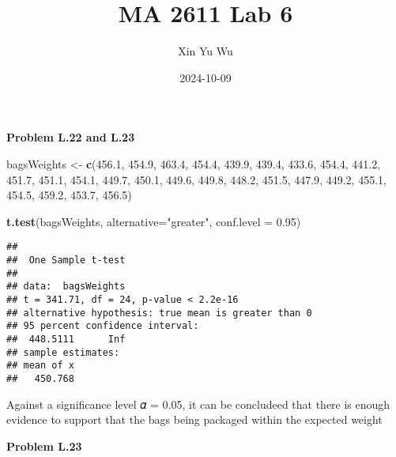 \documentclass[
]{article}
\title{MA 2611 Lab 6}
\author{Xin Yu Wu}
\date{2024-10-09}
\newenvironment{Shaded}{\begin{snugshade}}{\end{snugshade}}
\newcommand{\AttributeTok}[1]{\textcolor[rgb]{0.13,0.29,0.53}{#1}}
\newcommand{\DecValTok}[1]{\textcolor[rgb]{0.00,0.00,0.81}{#1}}
\newcommand{\FloatTok}[1]{\textcolor[rgb]{0.00,0.00,0.81}{#1}}
\newcommand{\FunctionTok}[1]{\textcolor[rgb]{0.13,0.29,0.53}{\textbf{#1}}}
\newcommand{\NormalTok}[1]{#1}
\newcommand{\OtherTok}[1]{\textcolor[rgb]{0.56,0.35,0.01}{#1}}
\newcommand{\SpecialCharTok}[1]{\textcolor[rgb]{0.81,0.36,0.00}{\textbf{#1}}}
\newcommand{\StringTok}[1]{\textcolor[rgb]{0.31,0.60,0.02}{#1}}
\begin{document}
\maketitle

\textbf{Problem L.22 and L.23}

\begin{Shaded}
\begin{Highlighting}[]
\NormalTok{bagsWeights }\OtherTok{\textless{}{-}} \FunctionTok{c}\NormalTok{(}\FloatTok{456.1}\NormalTok{, }\FloatTok{454.9}\NormalTok{, }\FloatTok{463.4}\NormalTok{, }\FloatTok{454.4}\NormalTok{, }\FloatTok{439.9}\NormalTok{, }\FloatTok{439.4}\NormalTok{, }\FloatTok{433.6}\NormalTok{, }\FloatTok{454.4}\NormalTok{, }\FloatTok{441.2}\NormalTok{, }\FloatTok{451.7}\NormalTok{, }\FloatTok{451.1}\NormalTok{, }\FloatTok{454.1}\NormalTok{, }\FloatTok{449.7}\NormalTok{, }\FloatTok{450.1}\NormalTok{, }\FloatTok{449.6}\NormalTok{, }\FloatTok{449.8}\NormalTok{, }\FloatTok{448.2}\NormalTok{, }\FloatTok{451.5}\NormalTok{, }\FloatTok{447.9}\NormalTok{, }\FloatTok{449.2}\NormalTok{, }\FloatTok{455.1}\NormalTok{, }\FloatTok{454.5}\NormalTok{, }\FloatTok{459.2}\NormalTok{, }\FloatTok{453.7}\NormalTok{, }\FloatTok{456.5}\NormalTok{)}

\FunctionTok{t.test}\NormalTok{(bagsWeights, }\AttributeTok{alternative=}\StringTok{"greater"}\NormalTok{, }\AttributeTok{conf.level =} \FloatTok{0.95}\NormalTok{)}
\end{Highlighting}
\end{Shaded}

\begin{verbatim}
## 
##  One Sample t-test
## 
## data:  bagsWeights
## t = 341.71, df = 24, p-value < 2.2e-16
## alternative hypothesis: true mean is greater than 0
## 95 percent confidence interval:
##  448.5111      Inf
## sample estimates:
## mean of x 
##   450.768
\end{verbatim}

Against a significance level 𝛼 = 0.05, it can be concludeed that there
is enough evidence to support that the bags being packaged within the
expected weight

\textbf{Problem L.23}

\begin{Shaded}
\end{Shaded}
\end{document}
